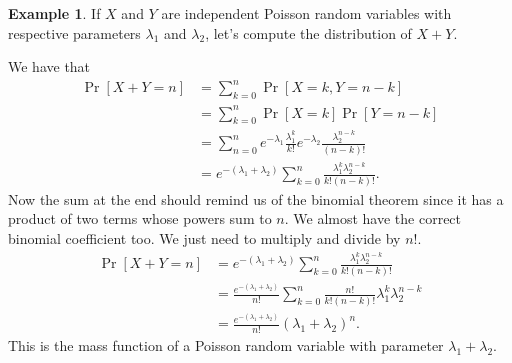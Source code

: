 \documentclass[12pt]{article}
\theoremstyle{plain}
\theoremstyle{definition}
\newtheorem{example}[theorem]{Example}
\theoremstyle{remark}
\begin{document}
\begin{example}\label{sum of Poissons}
    If $X$ and $Y$ are independent Poisson random variables with respective parameters $\lambda_1$ and $\lambda_2$, let's compute the distribution of $X+Y$.

    We have that
    \begin{align*}
        \Pr[X+Y = n] &= \sum_{k=0}^n\Pr[X = k, Y = n-k]\\
        &= \sum_{k=0}^n\Pr[X=k]\Pr[Y=n-k]\\
        &= \sum_{n=0}^n e^{-\lambda_1}\frac{\lambda_1^k}{k!}e^{-\lambda_2}\frac{\lambda_2^{n-k}}{(n-k)!}\\
        &= e^{-(\lambda_1+\lambda_2)}\sum_{k=0}^n\frac{\lambda_1^k\lambda_2^{n-k}}{k!(n-k)!}.
    \end{align*}
    Now the sum at the end should remind us of the binomial theorem since it has a product of two terms whose powers sum to $n$.
    We almost have the correct binomial coefficient too.
    We just need to multiply and divide by $n!$.
    \begin{align*}
        \Pr[X+Y = n] &= e^{-(\lambda_1+\lambda_2)}\sum_{k=0}^n\frac{\lambda_1^k\lambda_2^{n-k}}{k!(n-k)!}\\
        &= \frac{e^{-(\lambda_1+\lambda_2)}}{n!} \sum_{k=0}^n\frac{n!}{k!(n-k)!}\lambda_1^k\lambda_2^{n-k}\\
        &= \frac{e^{-(\lambda_1+\lambda_2)}}{n!}(\lambda_1+\lambda_2)^n.
    \end{align*}
    This is the mass function of a Poisson random variable with parameter $\lambda_1+\lambda_2$.
\end{example}
\end{document}
